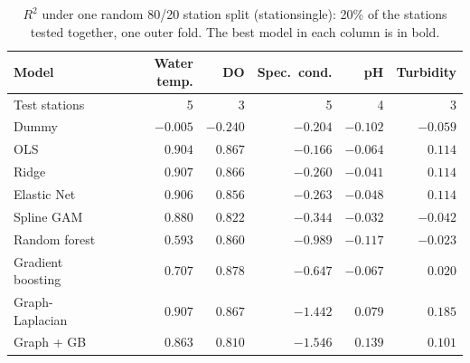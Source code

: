 \documentclass[11pt]{article}
\newcommand{\codeus}{\textunderscore\allowbreak}
\newcommand{\code}[1]{{\ttfamily\let\_\codeus #1}}
\begin{document}
\begin{table}[h]
\centering
\small
\caption{$R^2$ under one random 80/20 station split (\code{station\_single}): 20\% of the stations tested together, one outer fold. The best model in each column is in bold.}
\label{tab:split_single}
\begin{tabular}{l rrrrr}
\toprule
Model & Water temp. & DO & Spec.\ cond. & pH & Turbidity \\
\midrule
Test stations & 5 & 3 & 5 & 4 & 3 \\ \midrule
Dummy               & $-0.005$ & $-0.240$ & $-0.204$ & $-0.102$ & $-0.059$ \\
OLS                 & $0.904$ & $0.867$ & $\mathbf{-0.166}$ & $-0.064$ & $0.114$ \\
Ridge               & $0.907$ & $0.866$ & $-0.260$ & $-0.041$ & $0.114$ \\
Elastic Net         & $0.906$ & $0.856$ & $-0.263$ & $-0.048$ & $0.114$ \\
Spline GAM          & $0.880$ & $0.822$ & $-0.344$ & $-0.032$ & $-0.042$ \\
Random forest       & $0.593$ & $0.860$ & $-0.989$ & $-0.117$ & $-0.023$ \\
Gradient boosting   & $0.707$ & $\mathbf{0.878}$ & $-0.647$ & $-0.067$ & $0.020$ \\
Graph-Laplacian     & $\mathbf{0.907}$ & $0.867$ & $-1.442$ & $0.079$ & $\mathbf{0.185}$ \\
Graph + GB          & $0.863$ & $0.810$ & $-1.546$ & $\mathbf{0.139}$ & $0.101$ \\
\bottomrule
\end{tabular}
\end{table}
\end{document}
